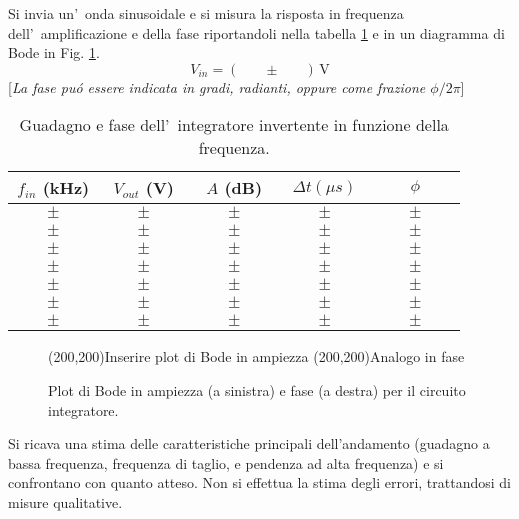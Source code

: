 \documentclass[10pt,a4paper]{article}
\newcommand{\rem}[1]{[\emph{#1}]}
\newcommand{\exn}{\phantom{xxx}}
\begin{document}
	Si invia un'~onda sinusoidale e si misura la risposta in frequenza dell'~amplificazione e della fase riportandoli 
	nella tabella \ref{tab:bodeinte} e in un diagramma di Bode in Fig. \ref{fig:bodeinte}. 
	\[
	V_{in} = (\exn \pm \exn )\,\mathrm{V}
	\]
	\rem{La fase pu\'o essere indicata in gradi, radianti, oppure come frazione $\phi/2\pi$}
	\begin{table}[h]
		\caption{Guadagno e fase dell'~integratore invertente in funzione della frequenza.}
		\label{tab:bodeinte}
		\begin{center}
			\begin{tabular}{|c|c|c|c|c|}
				\hline
				$f_{in}$ (kHz) & $V_{out}$ (V) & $A$ (dB) & $\Delta t (\mu s)$ & $\phi$ \\
				\hline
				$\exn \pm \exn $ & $\exn \pm \exn $ & $\exn \pm \exn $ & $\exn \pm \exn $ & $\exn \pm \exn $ \\
				\hline
				$\exn \pm \exn $ & $\exn \pm \exn $ & $\exn \pm \exn $ & $\exn \pm \exn $ & $\exn \pm \exn $ \\
				\hline
				$\exn \pm \exn $ & $\exn \pm \exn $ & $\exn \pm \exn $ & $\exn \pm \exn $ & $\exn \pm \exn $ \\
				\hline
				$\exn \pm \exn $ & $\exn \pm \exn $ & $\exn \pm \exn $ & $\exn \pm \exn $ & $\exn \pm \exn $ \\
				\hline
				$\exn \pm \exn $ & $\exn \pm \exn $ & $\exn \pm \exn $ & $\exn \pm \exn $ & $\exn \pm \exn $ \\
				\hline
				$\exn \pm \exn $ & $\exn \pm \exn $ & $\exn \pm \exn $ & $\exn \pm \exn $ & $\exn \pm \exn $ \\
				\hline
				$\exn \pm \exn $ & $\exn \pm \exn $ & $\exn \pm \exn $ & $\exn \pm \exn $ & $\exn \pm \exn $ \\
				\hline
			\end{tabular}
		\end{center}
	\end{table} 
	\begin{figure}[htb]
		\begin{center}
			\framebox(200,200){Inserire plot di Bode in ampiezza}
			\framebox(200,200){Analogo in fase}
		\end{center}
		\caption{\small Plot di Bode in ampiezza (a sinistra) e fase (a destra) per il circuito integratore.}
		\label{fig:bodeinte}
	\end{figure}
	
	Si ricava una stima delle caratteristiche principali dell'andamento (guadagno a bassa frequenza, frequenza di taglio, e pendenza ad alta frequenza)
	e si confrontano con quanto atteso. Non si effettua la stima degli errori, trattandosi di misure qualitative.
	
\end{document}
